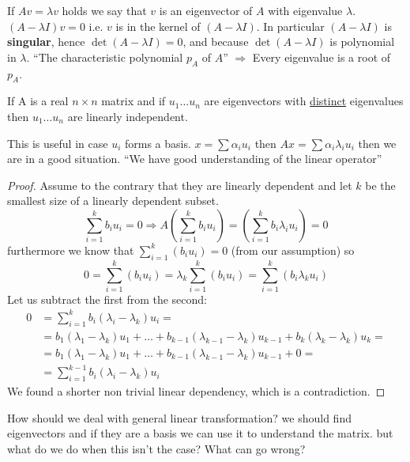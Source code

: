 If $Av=\lambda v$ holds we say that $v$ is an eigenvector of $A$
with eigenvalue $\lambda$. \\
$\left(A-\lambda I\right)v=0$ i.e. $v$ is in the kernel of $\left(A-\lambda I\right)$.
In particular $\left(A-\lambda I\right)$ is \textbf{singular}, hence
$\det\left(A-\lambda I\right)=0$, and because $\det\left(A-\lambda I\right)$
is polynomial in $\lambda$. ``The characteristic polynomial $p_{A}$
of $A$'' $\Rightarrow$ Every eigenvalue is a root of $p_{A}$.
\begin{proposition}
If A is a real $n\times n$ matrix and if $u_{1}\dots u_{n}$ are
eigenvectors with \uline{distinct} eigenvalues then $u_{1}\dots u_{n}$
are linearly independent.

\begin{insight}
This is useful in case $u_{i}$ forms a basis. $x=\sum\alpha_{i}u_{i}$
then $Ax=\sum\alpha_{i}\lambda_{i}u_{i}$ then we are in a good situation.
``We have good understanding of the linear operator''%
\end{insight}
\begin{proof}
Assume to the contrary that they are linearly dependent and let $k$
be the smallest size of a linearly dependent subset. 
\[
\sum\limits _{i=1}^{k}b_{i}u_{i}=0\Rightarrow A\left(\sum_{i=1}^{k}b_{i}u_{i}\right)=\left(\sum_{i=1}^{k}b_{i}\lambda_{i}u_{i}\right)=0
\]
furthermore we know that $\sum_{i=1}^{k}\left(b_{i}u_{i}\right)=0$
(from our assumption) so
\[
0=\sum_{i=1}^{k}\left(b_{i}u_{i}\right)=\lambda_{k}\sum_{i=1}^{k}\left(b_{i}u_{i}\right)=\sum_{i=1}^{k}\left(b_{i}\lambda_{k}u_{i}\right)
\]
 Let us subtract the first from the second:
\begin{align*}
0 & =\sum_{i=1}^{k}b_{i}\left(\lambda_{i}-\lambda_{k}\right)u_{i}=\\
 & =b_{1}\left(\lambda_{1}-\lambda_{k}\right)u_{1}+\dots+b_{k-1}\left(\lambda_{k-1}-\lambda_{k}\right)u_{k-1}+b_{k}\left(\lambda_{k}-\lambda_{k}\right)u_{k}=\\
 & =b_{1}\left(\lambda_{1}-\lambda_{k}\right)u_{1}+\dots+b_{k-1}\left(\lambda_{k-1}-\lambda_{k}\right)u_{k-1}+0=\\
 & =\sum_{i=1}^{k-1}b_{i}\left(\lambda_{i}-\lambda_{k}\right)u_{i}
\end{align*}
 We found a shorter non trivial linear dependency, which is a contradiction. 
\end{proof}
How should we deal with general linear transformation? we should find
eigenvectors and if they are a basis we can use it to understand the
matrix. but what do we do when this isn't the case? What can go wrong? 
\end{proposition}

